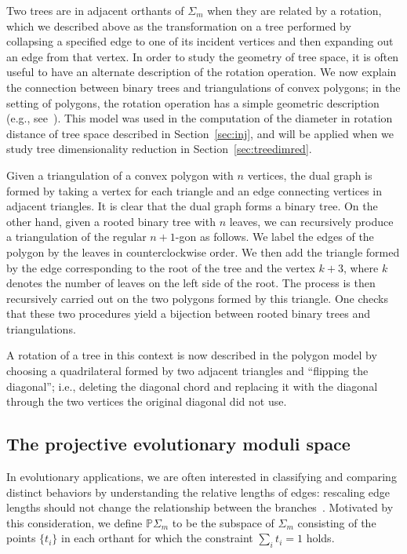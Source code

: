 \documentclass[a4paper,11pt]{article}
\begin{document}
Two trees are in adjacent orthants of $\Sigma_m$ when they are related by a rotation, which we described above as the transformation on a tree performed by collapsing a specified edge to one of its incident vertices and then expanding out an edge from that vertex.
In order to study the geometry of tree space, it is often useful to have an alternate description of the rotation operation.
We now explain the connection between binary trees and triangulations of convex polygons; in the setting of polygons, the rotation operation has a simple geometric description (e.g., see~\cite{sleator1988rotation}).
This model was used in the computation of the diameter in rotation distance of tree space described in Section~\ref{sec:inj}, and will be applied when we study tree dimensionality reduction in Section~\ref{sec:treedimred}.

Given a triangulation of a convex polygon with $n$ vertices, the dual graph is formed by taking a vertex for each triangle and an edge connecting vertices in adjacent triangles.
It is clear that the dual graph forms a binary tree.
On the other hand, given a rooted binary tree with $n$ leaves, we can recursively produce a triangulation of the regular $n+1$-gon as follows.
We label the edges of the polygon by the leaves in counterclockwise order.
We then add the triangle formed by the edge corresponding to the root of the tree and the vertex $k+3$, where $k$ denotes the number of leaves on the left side of the root.
The process is then recursively carried out on the two polygons formed by this triangle.
One checks that these two procedures yield a bijection between rooted binary trees and triangulations.

A rotation of a tree in this context is now described in the polygon model by choosing a quadrilateral formed by two adjacent triangles and ``flipping the diagonal''; i.e., deleting the diagonal chord and replacing it with the diagonal through the two vertices the original diagonal did not use.
\fi

\subsection{The projective evolutionary moduli space}

In evolutionary applications, we are often interested in classifying and comparing distinct behaviors by understanding the relative lengths of edges: rescaling edge lengths should not change the relationship between the branches~\cite{zairis2014moduli}.
Motivated by this consideration, we define $\mathbb{P} \Sigma_m$ to be the subspace of $\Sigma_m$ consisting of the points $\{t_i\}$ in each orthant for which the constraint $\sum_{i} t_i = 1$ holds.
\end{document}
